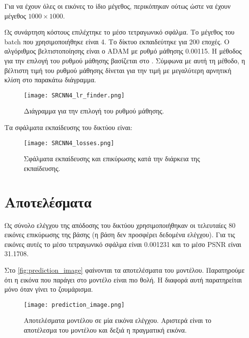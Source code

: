 \documentclass[a4paper]{article}
\begin{document}
Για να έχουν όλες οι εικόνες το ίδιο μέγεθος, περικόπηκαν ούτως ώστε να έχουν
μέγεθος $1000 \times 1000$.

Ως συνάρτηση κόστους επιλέχτηκε το μέσο τετραγωνικό σφάλμα. Το μέγεθος του batch
που χρησιμοποιήθηκε είναι 4. Το δίκτυο εκπαιδεύτηκε για 200 εποχές. Ο αλγόριθμος
βελτιστοποίησης είναι ο ADAM με ρυθμό μάθησης 0.00115. Η μέθοδος για την επιλογή
του ρυθμού μάθησης βασίζεται στο \cite{lr}. Σύμφωνα με αυτή τη μέθοδο, η
βέλτιστη τιμή του ρυθμού μάθησης δίνεται για την τιμή με μεγαλύτερη αρνητική
κλίση στο παρακάτω διάγραμμα.

\begin{figure}[H]
    \centering

    \texttt{[image: SRCNN4\_lr\_finder.png]}

    \caption{Διάγραμμα για την επιλογή του ρυθμού μάθησης.}
\end{figure}

Τα σφάλματα εκπαίδευσης του δικτύου είναι:

\begin{figure}[H]
    \centering

    \texttt{[image: SRCNN4\_losses.png]}

    \caption{Σφάλματα εκπαίδευσης και επικύρωσης κατά την διάρκεια της
    εκπαίδευσης.}
\end{figure}

\section{Αποτελέσματα}

Ως σύνολο ελέγχου της απόδοσης του δικτύου χρησιμοποιήθηκαν οι τελευταίες 80
εικόνες επικύρωσης της βάσης (η βάση δεν προσφέρει δεδομένα ελέγχου). Για τις
εικόνες αυτές το μέσο τετραγωνικό σφάλμα είναι 0.001231 και το μέσο PSNR είναι
31.1708.

Στο \autoref{fig:prediction_image} φαίνονται τα αποτελέσματα του μοντέλου.
Παρατηρούμε ότι η εικόνα που παράγει στο μοντέλο είναι πιο θολή. Η διαφορά αυτή
παρατηρείται μόνο όταν γίνει το ζουμάρισμα.

\begin{figure}[H]
    \centering

    \texttt{[image: prediction\_image.png]}

    \caption{Αποτελέσματα μοντέλου σε μία εικόνα ελέγχου. Αριστερά είναι το
    αποτέλεσμα του μοντέλου και δεξιά η πραγματική εικόνα.}
    \label{fig:prediction_image}
\end{figure}




\newpage
\begin{english}
    \printbibliography[title=Βιβλιογραφία]
\end{english}
\end{document}
